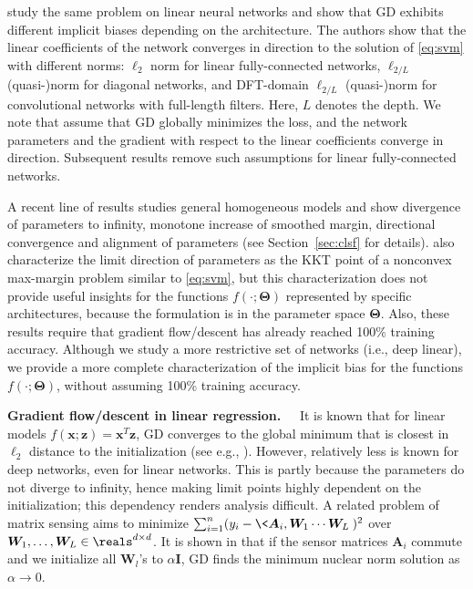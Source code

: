 \documentclass{article} %
\def\vx{{\bm{x}}}
\def\vz{{\bm{z}}}
\def\mA{{\bm{A}}}
\def\mI{{\bm{I}}}
\def\mW{{\bm{W}}}
\newcommand{\bTheta}{\bm{\Theta}}
\begin{document}
\citet{gunasekar2018implicit} study the same problem on linear neural networks and show that GD exhibits different implicit biases depending on the architecture. 
The authors show that the linear coefficients of the network converges in direction to the solution of \eqref{eq:svm} with different norms: $\ell_2$ norm for linear fully-connected networks, $\ell_{2/L}$ (quasi-)norm for diagonal networks, and DFT-domain $\ell_{2/L}$ (quasi-)norm for convolutional networks with full-length filters. Here, $L$ denotes the depth. We note that \citet{gunasekar2018implicit} assume that GD globally minimizes the loss, and the network parameters and the gradient with respect to the linear coefficients converge in direction.
Subsequent results \citep{ji2019gradient,ji2020directional} remove such assumptions for linear fully-connected networks. 

A recent line of results \citep{nacson2019lexicographic,lyu2020gradient,ji2020directional} studies general homogeneous models and show divergence of parameters to infinity, monotone increase of smoothed margin, directional convergence and alignment of parameters (see Section~\ref{sec:clsf} for details). \citet{lyu2020gradient} also characterize the limit direction of parameters as the KKT point of a nonconvex max-margin problem similar to \eqref{eq:svm}, but this characterization does not provide useful insights for the functions $f(\cdot;\bTheta)$ represented by specific architectures, because the formulation is in the parameter space $\bTheta$. Also, these results require that gradient flow/descent has already reached 100\% training accuracy. Although we study a more restrictive set of networks (i.e., deep linear), we provide a more complete characterization of the implicit bias for the functions $f(\cdot;\bTheta)$, without assuming 100\% training accuracy.

\textbf{Gradient flow/descent in linear regression.~~}
It is known that for linear models $f(\vx;\vz) = \vx^T \vz$, GD converges to the global minimum that is closest in $\ell_2$ distance to the initialization (see e.g., \citet{gunasekar2018characterizing}). However, relatively less is known for deep networks, even for linear networks. This is partly because the parameters do not diverge to infinity, hence making limit points highly dependent on the initialization; this dependency renders analysis difficult.
A related problem of matrix sensing aims to minimize $\sum_{i=1}^n (y_i - \< \mA_i, \mW_1 \cdots \mW_L \> )^2$ over $\mW_1, \dots, \mW_L \in \reals^{d\times d}$. It is shown in \citet{gunasekar2017implicit, arora2019implicit} that if the sensor matrices $\mA_i$ commute and we initialize all $\mW_l$'s to $\alpha \mI$, GD finds the minimum nuclear norm solution as $\alpha \to 0$.
\end{document}

